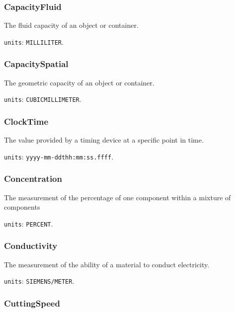\subsubsection{CapacityFluid}
\label{sec:CapacityFluid}



The fluid capacity of an object or container.


\texttt{units}: \texttt{MILLILITER}.


\subsubsection{CapacitySpatial}
\label{sec:CapacitySpatial}



The geometric capacity of an object or container.


\texttt{units}: \texttt{CUBIC\textunderscore MILLIMETER}.


\subsubsection{ClockTime}
\label{sec:ClockTime}



The value provided by a timing device at a specific point in time.


\texttt{units}: \texttt{yyyy-mm-ddthh:mm:ss.ffff}.


\subsubsection{Concentration}
\label{sec:Concentration}



The measurement of the percentage of one component within a mixture of components


\texttt{units}: \texttt{PERCENT}.


\subsubsection{Conductivity}
\label{sec:Conductivity}



The measurement of the ability of a material to conduct electricity.


\texttt{units}: \texttt{SIEMENS/METER}.


\subsubsection{CuttingSpeed}
\label{sec:CuttingSpeed}



